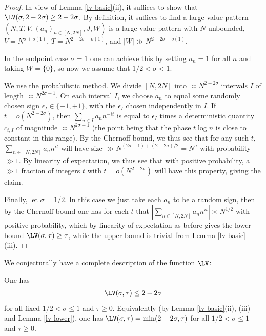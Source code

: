 \begin{proof} In view of Lemma \ref{lv-basic}(ii), it suffices to show that $\LV(\sigma, 2-2\sigma) \geq 2-2\sigma$.  By definition, it suffices to find a large value pattern $(N,T,V,(a_n)_{n \in [N,2N]},J,W)$ is a large value pattern with $N$ unbounded, $V=N^{\sigma+o(1)}$, $T = N^{2-2\sigma+o(1)}$, and $|W| \gg N^{2-2\sigma-o(1)}$.

In the endpoint case $\sigma = 1$ one can achieve this by setting $a_n=1$ for all $n$ and taking $W=\{0\}$, so now we assume that $1/2 < \sigma<1$.

We use the probabilistic method.  We divide $[N,2N]$ into $\asymp N^{2-2\sigma}$ intervals $I$ of length $\asymp N^{2\sigma-1}$.  On each interval $I$, we choose $a_n$ to equal some randomly chosen sign $\epsilon_I \in \{-1,+1\}$, with the $\epsilon_I$ chosen independently in $I$.  If $t = o(N^{2-2\sigma})$, then $\sum_{n \in I} a_n n^{-it}$ is equal to $\epsilon_I$ times a deterministic quantity $c_{t,I}$ of magnitude $\asymp N^{2\sigma-1}$ (the point being that the phase $t \log n$ is close to constant in this range).  By the Chernoff bound, we thus see that for any such $t$, $\sum_{n \in [N,2N]} a_n n^{it}$ will have size $\gg N^{(2\sigma-1) + (2-2\sigma)/2} = N^\sigma$ with probability $\gg 1$. By linearity of expectation, we thus see that with positive probability, a $\gg 1$ fraction of integers $t$ with $t = o(N^{2-2\sigma})$ will have this property, giving the claim.

Finally, let $\sigma=1/2$.  In this case we just take each $a_n$ to be a random sign, then by the Chernoff bound one has for each $t$ that $|\sum_{n \in [N,2N]} a_n n^{it}| \asymp N^{1/2}$ with positive probability, which by linearity of expectation as before gives the lower bound $\LV(\sigma,\tau) \geq \tau$, while the upper bound is trivial from Lemma \ref{lv-basic}(iii).
\end{proof}

We conjecturally have a complete description of the function $\LV$:

\begin{conjecture}\label{montgomery-conj}  One has
    \begin{equation}\label{mont-conj}
        \LV(\sigma, \tau) \leq 2 - 2 \sigma
    \end{equation}
     for all fixed $1/2 < \sigma \leq 1$ and $\tau \geq 0$. Equivalently (by Lemma \ref{lv-basic}(ii), (iii) and Lemma \ref{lv-lower}), one has $\LV(\sigma, \tau) = \min(2 - 2 \sigma,\tau)$ for all $1/2 < \sigma \leq 1$ and $\tau \geq 0$.
\end{conjecture}

